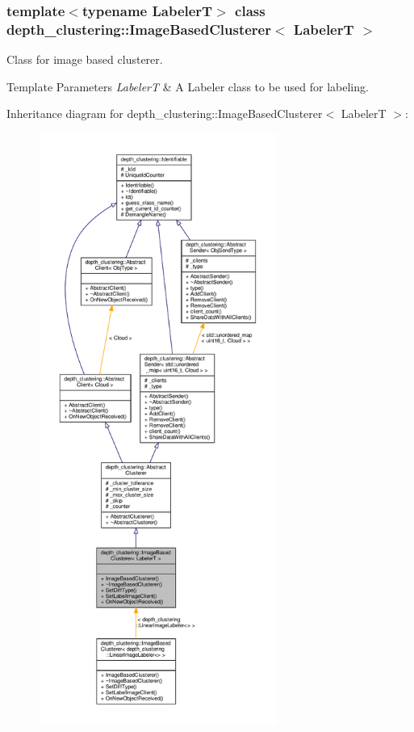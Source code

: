 \subsubsection*{template$<$typename LabelerT$>$\newline
class depth\+\_\+clustering\+::\+Image\+Based\+Clusterer$<$ Labeler\+T $>$}

Class for image based clusterer. 


\begin{DoxyTemplParams}{Template Parameters}
{\em LabelerT} & A Labeler class to be used for labeling. \\
\hline
\end{DoxyTemplParams}


Inheritance diagram for depth\+\_\+clustering\+:\+:Image\+Based\+Clusterer$<$ LabelerT $>$\+:\nopagebreak
\begin{figure}[H]
\begin{center}
\leavevmode
\includegraphics[height=550pt]{classdepth__clustering_1_1ImageBasedClusterer__inherit__graph}
\end{center}
\end{figure}


